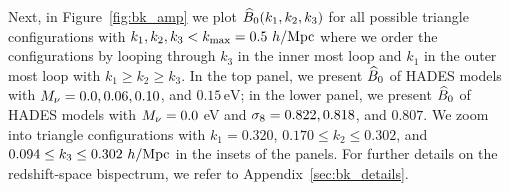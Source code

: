 Next, in Figure~\ref{fig:bk_amp} we plot $\widehat{B}_0(k_1, k_2, k_3)$ for all possible triangle 
configurations with $k_1, k_2, k_3 < k_{\rm max} = 0.5~h/{\rm Mpc}$ where we order the 
configurations by looping through $k_3$ in the inner most loop and $k_1$ in the outer most 
loop with $k_1 \geq k_2 \geq k_3$. In the top panel, we present $\widehat{B}_0$ of HADES models 
with $M_\nu = 0.0, 0.06, 0.10$, and $0.15\,\mathrm{eV}$; in the lower panel, we present 
$\widehat{B}_0$ of HADES models with $M_\nu = 0.0$ eV and $\sigma_8 = 0.822, 0.818$, and $0.807$. We 
zoom into triangle configurations with $k_1 = 0.320$, $0.170 \leq k_2 \leq 0.302$, and 
$0.094 \leq k_3 \leq 0.302~h/{\rm Mpc}$ in the insets of the panels. For further details on the
redshift-space bispectrum, we refer to Appendix~\ref{sec:bk_details}. 
